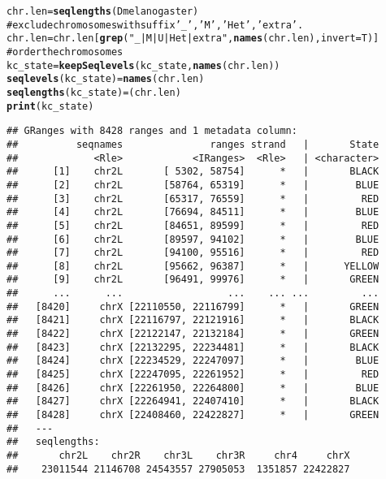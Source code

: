 \documentclass[11pt, oneside]{article}\usepackage{graphicx, color}
\makeatletter
\newcommand{\hlfunctioncall}[1]{\textcolor[rgb]{0.501960784313725,0,0.329411764705882}{\textbf{#1}}}%
\newcommand{\hlstring}[1]{\textcolor[rgb]{0.6,0.6,1}{#1}}%
\newcommand{\hlcomment}[1]{\textcolor[rgb]{0.180392156862745,0.6,0.341176470588235}{#1}}%
\newenvironment{kframe}{%
 \def\at@end@of@kframe{}%
 \ifinner\ifhmode%
  \def\at@end@of@kframe{\end{minipage}}%
  \begin{minipage}{\columnwidth}%
 \fi\fi%
 \def\FrameCommand##1{\hskip\@totalleftmargin \hskip-\fboxsep
 \colorbox{shadecolor}{##1}\hskip-\fboxsep
     \hskip-\linewidth \hskip-\@totalleftmargin \hskip\columnwidth}%
 \MakeFramed {\advance\hsize-\width
   \@totalleftmargin\z@ \linewidth\hsize
   \@setminipage}}%
 {\par\unskip\endMakeFramed%
 \at@end@of@kframe}
\newenvironment{knitrout}{}{} %
\makeatother
\begin{document}
\begin{knitrout}
\begin{kframe}
{\ttfamily\noindent\color{warningcolor}{\#\# Warning: package 'Biostrings' was built under R version 2.15.2}}\begin{alltt}
chr.len = \hlfunctioncall{seqlengths}(Dmelanogaster)
\hlcomment{# exclude chromosomes with suffix '_' , 'M', 'Het', 'extra'.}
chr.len = chr.len[\hlfunctioncall{grep}(\hlstring{"_|M|U|Het|extra"}, \hlfunctioncall{names}(chr.len), invert = T)]
\hlcomment{# order the chromosomes}
kc_state = \hlfunctioncall{keepSeqlevels}(kc_state, \hlfunctioncall{names}(chr.len))
\hlfunctioncall{seqlevels}(kc_state) = \hlfunctioncall{names}(chr.len)
\hlfunctioncall{seqlengths}(kc_state) = (chr.len)
\hlfunctioncall{print}(kc_state)
\end{alltt}
\begin{verbatim}
## GRanges with 8428 ranges and 1 metadata column:
##          seqnames               ranges strand   |       State
##             <Rle>            <IRanges>  <Rle>   | <character>
##      [1]    chr2L       [ 5302, 58754]      *   |       BLACK
##      [2]    chr2L       [58764, 65319]      *   |        BLUE
##      [3]    chr2L       [65317, 76559]      *   |         RED
##      [4]    chr2L       [76694, 84511]      *   |        BLUE
##      [5]    chr2L       [84651, 89599]      *   |         RED
##      [6]    chr2L       [89597, 94102]      *   |        BLUE
##      [7]    chr2L       [94100, 95516]      *   |         RED
##      [8]    chr2L       [95662, 96387]      *   |      YELLOW
##      [9]    chr2L       [96491, 99976]      *   |       GREEN
##      ...      ...                  ...    ... ...         ...
##   [8420]     chrX [22110550, 22116799]      *   |       GREEN
##   [8421]     chrX [22116797, 22121916]      *   |       BLACK
##   [8422]     chrX [22122147, 22132184]      *   |       GREEN
##   [8423]     chrX [22132295, 22234481]      *   |       BLACK
##   [8424]     chrX [22234529, 22247097]      *   |        BLUE
##   [8425]     chrX [22247095, 22261952]      *   |         RED
##   [8426]     chrX [22261950, 22264800]      *   |        BLUE
##   [8427]     chrX [22264941, 22407410]      *   |       BLACK
##   [8428]     chrX [22408460, 22422827]      *   |       GREEN
##   ---
##   seqlengths:
##       chr2L    chr2R    chr3L    chr3R     chr4     chrX
##    23011544 21146708 24543557 27905053  1351857 22422827
\end{verbatim}
\end{kframe}
\end{knitrout}
\end{document}
